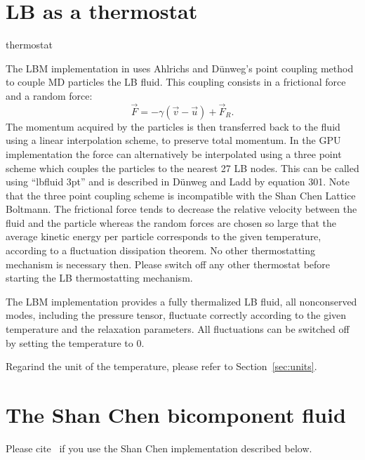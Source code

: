 \section{LB as a thermostat}
\begin{essyntax}
  thermostat  
  \begin{features}
  \end{features}
\end{essyntax}
The LBM implementation in \es uses Ahlrichs and D\"unweg's point coupling method
to couple MD particles the LB fluid. This coupling consists
in a frictional force and a random force:
\begin{equation*}
  \vec{F} = -\gamma \left(\vec{v}-\vec{u}\right) + \vec{F}_R.
\end{equation*}
The momentum acquired by the particles is then transferred back to the fluid using a linear interpolation scheme, to preserve total momentum.
In the GPU implementation the force can alternatively be interpolated using a three point scheme which couples the particles to the nearest 27 LB nodes.
This can be called using ``lbfluid  3pt'' and is described in D\"{u}nweg and Ladd by equation 301\cite{duenweg08a}. Note that the three point coupling scheme is incompatible with the Shan Chen Lattice Boltmann.
The frictional force tends to decrease the relative velocity
between the fluid and the particle whereas the random forces are chosen
so large that the average kinetic energy per particle corresponds to
the given temperature, according to a fluctuation dissipation theorem.
No other thermostatting mechanism is necessary then. Please switch off any other thermostat 
 before starting the LB thermostatting mechanism.

The LBM implementation provides a fully thermalized LB fluid, \ie all
nonconserved modes, including the pressure tensor, fluctuate correctly
according to the given temperature and the relaxation parameters. All
fluctuations can be switched off by setting the temperature to 0.

Regarind the unit of the temperature, please refer to
Section~\ref{sec:units}.

\section{The Shan Chen bicomponent fluid\label{sec:shanchen}}
\begin{citebox}
  Please cite~ if you use the Shan Chen implementation described below.
\end{citebox}


